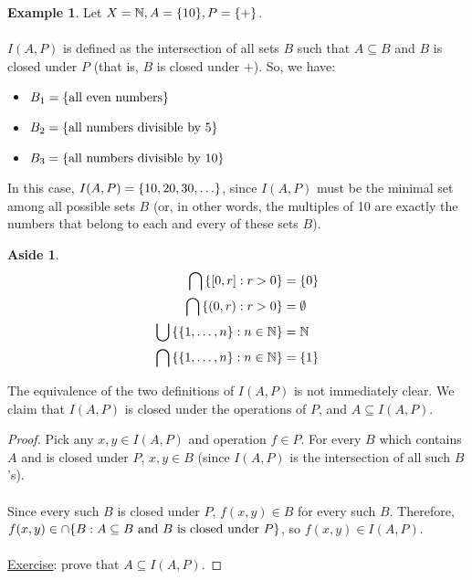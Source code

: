 \documentclass[]{article}
\DeclarePairedDelimiter{\set}{\lbrace}{\rbrace}
\theoremstyle{definition}
\newtheorem*{aside}{Aside}
\newtheorem{ex}{Example}[section]
\begin{document}
        \begin{ex}
          Let $X = \mathbb{N}, A = \set{10}, P = \set{+}$.
          \\ \\
          $I(A, P)$ is defined as the intersection of all sets $B$ such that $ A \subseteq B $ and $B$ is closed under $P$ (that is, $B$ is closed under $+$). So, we have:
          \begin{itemize}
            \item $B_1 = \set{\text{all even numbers}}$
            \item $B_2 = \set{\text{all numbers divisible by 5}}$
            \item $B_3 = \set{\text{all numbers divisible by 10}}$
          \end{itemize}

          In this case, $I(A, P) = \set{10, 20, 30, \ldots}$, since $I(A, P)$ must be the minimal set among all possible sets $B$ (or, in other words, the multiples of 10 are exactly the numbers that belong to each and every of these sets $B$).
        \end{ex}

        \begin{aside}
          \begin{align*}
            \bigcap \left\{ [0, r] : r > 0 \right\} &= \set{0} \\
            \bigcap \left\{ (0, r) : r > 0 \right\} &= \emptyset \\
            \bigcup \left\{ \set{1, \ldots, n} : n \in \mathbb{N} \right\} &= \mathbb{N} \\
            \bigcap \left\{ \set{1, \ldots, n} : n \in \mathbb{N} \right\} &= \set{1}
          \end{align*}
        \end{aside}

        The equivalence of the two definitions of $I(A, P)$ is not immediately clear. We claim that $I(A, P)$ is closed under the operations of $P$, and $A \subseteq I(A, P)$.

        \begin{proof}
          Pick any $x, y \in I(A, P)$ and operation $f \in P$. For every $B$ which contains $A$ and is closed under $P$, $x, y \in B$ (since $I(A,P)$ is the intersection of all such $B$'s).
          \\ \\
          Since every such $B$ is closed under $P$, $f(x, y) \in B$ for every such $B$. Therefore, $f(x, y) \in \cap \set{ B : A \subseteq B \text{ and } B \text{ is closed under } P}$, so $f(x,y) \in I(A, P)$.
          \\ \\
          \underline{Exercise}: prove that $A \subseteq I(A, P)$.
        \end{proof}
\end{document}
